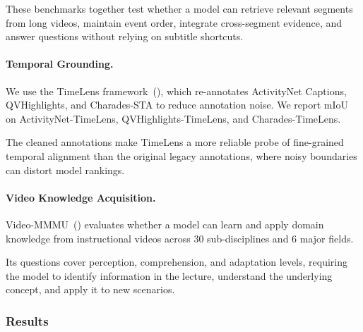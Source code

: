 \documentclass{article} %
\begin{document}
These benchmarks together test whether a model can retrieve relevant segments from long videos, maintain event order, integrate cross-segment evidence, and answer questions without relying on subtitle shortcuts.

\paragraph{Temporal Grounding.}
We use the TimeLens framework~(\cite{zhang2025timelens}), which re-annotates ActivityNet Captions, QVHighlights, and Charades-STA to reduce annotation noise. We report mIoU on ActivityNet-TimeLens, QVHighlights-TimeLens, and Charades-TimeLens.

The cleaned annotations make TimeLens a more reliable probe of fine-grained temporal alignment than the original legacy annotations, where noisy boundaries can distort model rankings.

\paragraph{Video Knowledge Acquisition.}
Video-MMMU~(\cite{videommmu}) evaluates whether a model can learn and apply domain knowledge from instructional videos across 30 sub-disciplines and 6 major fields.

Its questions cover perception, comprehension, and adaptation levels, requiring the model to identify information in the lecture, understand the underlying concept, and apply it to new scenarios.

\subsubsection{Results}
\end{document}
